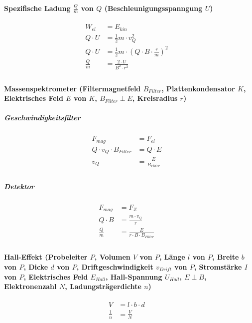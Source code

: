\paragraph{Spezifische Ladung $\frac{Q}{m}$ von $Q$ (Beschleunigungsspanngung $U$)}
\begin{align*}
  W_{el} &= E_{kin} &\\
  Q \cdot U &= \frac{1}{2}m \cdot v_Q^2 &\\
  Q \cdot U &= \frac{1}{2}m \cdot \left( Q \cdot B \cdot \frac{r}{m} \right)^2 &\\
  \frac{Q}{m} &= \frac{2 \cdot U}{B^2 \cdot r^2} &\\
\end{align*}

\paragraph{Massenspektrometer (Filtermagnetfeld $B_{Filter}$, Plattenkondensator $K$, Elektrisches
Feld $E$ von $K$, $B_{Filter} \perp E$, Kreisradius $r$)}

\subparagraph{Geschwindigkeitsfilter}
\begin{align*}
  F_{mag} &= F_{el} &\\
  Q \cdot v_Q \cdot B_{Filter} &= Q \cdot E &\\
  v_Q &= \frac{E}{B_{Filter}} &\\
\end{align*}

\subparagraph{Detektor}
\begin{align*}
  F_{mag} &= F_Z &\\
  Q \cdot B &= \frac{m \cdot v_Q}{r} &\\
  \frac{Q}{m} &= \frac{E}{r \cdot B \cdot B_{Filter}} &\\
\end{align*}

\paragraph{Hall-Effekt (Probeleiter $P$, Volumen $V$ von $P$, Länge $l$ von $P$, Breite $b$ von $P$,
Dicke $d$ von $P$, Driftgeschwindigkeit $v_{Drift}$ von $P$, Stromstärke $I$ von $P$, Elektrisches
Feld $E_{Hall}$, Hall-Spannung $U_{Hall}$, $E \perp B$, Elektronenzahl $N$, Ladungsträgerdichte $n$)}
\begin{align*}
  V &= l \cdot b \cdot d &\\
  \frac{1}{n} &= \frac{V}{N}
\end{align*}

